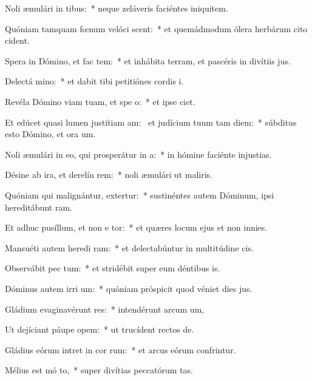 \item Noli æmulári in tibus:~* neque zeláveris faciéntes iniquitem.
\item Quóniam tamquam fœnum velóci scent:~* et quemádmodum ólera herbárum cito cident.
\item Spera in Dómino, et fac tem:~* et inhábita terram, et pascéris in divítiis jus.
\item Delectá  mino:~* et dabit tibi petitiónes cordis i.
\item Revéla Dómino viam tuam, et spe  o:~* et ipse ciet.
\item Et edúcet quasi lumen justítiam am:~\pscross{} et judícium tuum tam diem:~* súbditus esto Dómino, et ora um.
\item Noli æmulári in eo, qui prosperátur in  a:~* in hómine faciénte injustias.
\item Désine ab ira, et derelín rem:~* noli æmulári ut maliris.
\item Quóniam qui malignántur, extertur:~* sustinéntes autem Dóminum, ipsi hereditábunt ram.
\item Et adhuc pusíllum, et non e tor:~* et quæres locum ejus et non innies.
\item Mansuéti autem heredi ram:~* et delectabúntur in multitúdine cis.
\item Observábit pec tum:~* et stridébit super eum déntibus is.
\item Dóminus autem irri um:~* quóniam próspicit quod véniet dies jus.
\item Gládium evaginavérunt res:~* intendérunt arcum um,
\item Ut dejíciant páupe  opem:~* ut trucídent rectos de.
\item Gládius eórum intret in cor rum:~* et arcus eórum confrintur.
\item Mélius est mó to,~* super divítias peccatórum tas.
